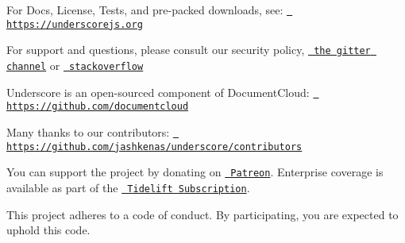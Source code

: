 For Docs, License, Tests, and pre-\/packed downloads, see\+: \href{https://underscorejs.org}{\texttt{ https\+://underscorejs.\+org}}

For support and questions, please consult our security policy, \href{https://gitter.im/jashkenas/underscore}{\texttt{ the gitter channel}} or \href{https://stackoverflow.com/search?q=underscore.js}{\texttt{ stackoverflow}}

Underscore is an open-\/sourced component of Document\+Cloud\+: \href{https://github.com/documentcloud}{\texttt{ https\+://github.\+com/documentcloud}}

Many thanks to our contributors\+: \href{https://github.com/jashkenas/underscore/contributors}{\texttt{ https\+://github.\+com/jashkenas/underscore/contributors}}

You can support the project by donating on \href{https://patreon.com/juliangonggrijp}{\texttt{ Patreon}}. Enterprise coverage is available as part of the \href{https://tidelift.com/subscription/pkg/npm-underscore?utm_source=npm-underscore&utm_medium=referral&utm_campaign=enterprise}{\texttt{ Tidelift Subscription}}.

This project adheres to a code of conduct. By participating, you are expected to uphold this code. 